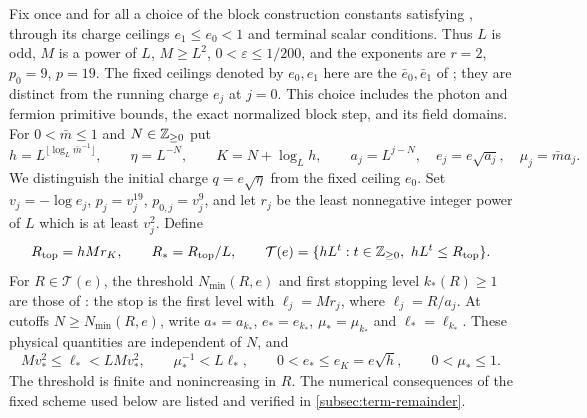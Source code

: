 Fix once and for all a choice of the block construction constants
satisfying \cite[Proposition~4.1]{QED3Integration}, through its
charge ceilings $e_1\le e_0<1$ and terminal scalar conditions.
Thus $L$ is odd, $M$ is a power of $L$, $M\ge L^2$,
$0<\varepsilon\le1/200$, and the exponents are
$r=2$, $p_0=9$, $p=19$.
The fixed ceilings denoted by $e_0,e_1$ here are the
$\bar e_0,\bar e_1$ of \cite{QED3Integration};
they are distinct from the running charge $e_j$ at $j=0$.
This choice includes the photon and fermion primitive bounds,
the exact normalized block step, and its field domains.
For $0<\bar m\le1$ and $N\in\mathbb Z_{\ge0}$ put
\[
 h=L^{\lfloor\log_L\bar m^{-1}\rfloor},\qquad
 \eta=L^{-N},\qquad K=N+\log_Lh,\qquad
 a_j=L^{j-N},\quad e_j=e\sqrt{a_j},\quad \mu_j=\bar m a_j.
\]
We distinguish the initial charge $q=e\sqrt\eta$ from the fixed
ceiling $e_0$. Set $v_j=-\log e_j$, $p_j=v_j^{19}$,
$p_{0,j}=v_j^9$, and let $r_j$ be the least nonnegative
integer power of $L$ which is at least $v_j^2$. Define
\[
 R_{\rm top}=hMr_K,\qquad R_*=R_{\rm top}/L,\qquad
 \mathcal T(e)=\{hL^t:t\in\mathbb Z_{\ge0},\ hL^t\le R_{\rm top}\}.
\]
For $R\in\mathcal T(e)$, the threshold $N_{\min}(R,e)$
and first stopping level $k_*(R)\ge1$ are those of
\cite[Proposition~6.1 and (52)]{CoverTuning}:
the stop is the first level with $\ell_j=Mr_j$, where
$\ell_j=R/a_j$. At cutoffs $N\ge N_{\min}(R,e)$, write
$a_*=a_{k_*}$, $e_*=e_{k_*}$, $\mu_*=\mu_{k_*}$ and
$\ell_*=\ell_{k_*}$. These physical quantities are independent of $N$,
and
\begin{equation}\label{eq:tpm-stop-scales}
 Mv_*^2\le\ell_*<LMv_*^2,\qquad
 \mu_*^{-1}<L\ell_*,\qquad 0<e_*\le e_K=e\sqrt h,\qquad
 0<\mu_*\le1.
\end{equation}
The threshold is finite and nonincreasing in $R$.
The numerical consequences of the fixed scheme used below are
listed and verified in \cref{subsec:term-remainder}.

